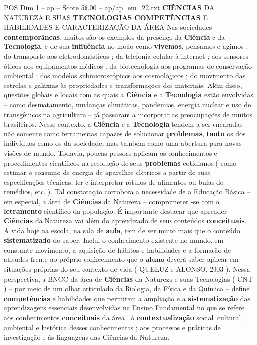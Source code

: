 \begin{textsample}{POS Dim 1 – ap – Score 56.00 – ap/ap\_em\_22.txt}  \label{ex:f1_pos_163}
\textbf{CIÊNCIAS} DA NATUREZA E SUAS \textbf{TECNOLOGIAS} \textbf{COMPETÊNCIAS} E HABILIDADES E CARACTERIZAÇÃO DA ÁREA Nas sociedades \textbf{contemporâneas}, muitos são os exemplos da presença da \textbf{Ciência} e da \textbf{Tecnologia}, e de sua \textbf{influência} no modo como \textbf{vivemos}, pensamos e agimos : do transporte aos eletrodomésticos ; da telefonia celular à internet ; dos sensores óticos aos equipamentos médicos ; da biotecnologia aos programas de conservação ambiental ; dos modelos submicroscópicos aos cosmológicos ; do movimento das estrelas e galáxias às propriedades e transformações dos materiais.
Além disso, questões globais e locais com as quais a \textbf{Ciência} e a \textbf{Tecnologia} estão envolvidas – como desmatamento, mudanças climáticas, pandemias, energia nuclear e uso de transgênicos na agricultura – já passaram a incorporar as preocupações de muitos brasileiros.
Nesse contexto, a \textbf{Ciência} e a \textbf{Tecnologia} tendem a ser encaradas não somente como ferramentas capazes de solucionar \textbf{problemas}, \textbf{tanto} os dos indivíduos como os da sociedade, mas também como uma abertura para novas visões de mundo.
Todavia, poucas pessoas aplicam os conhecimentos e procedimentos científicos na resolução de seus \textbf{problemas} cotidianos ( como estimar o consumo de energia de aparelhos elétricos a partir de suas especificações técnicas, ler e interpretar rótulos de alimentos ou bulas de remédios, etc. ).
Tal constatação corrobora a necessidade de a Educação Básica – em especial, a área de \textbf{Ciências} da Natureza – comprometer -se com o \textbf{letramento} científico da população.
É importante destacar que aprender \textbf{Ciências} da Natureza vai além do aprendizado de seus conteúdos \textbf{conceituais}.
A vida hoje na escola, na sala de \textbf{aula}, tem de ser muito mais que o conteúdo \textbf{sistematizado} do saber.
Inclui o conhecimento existente no mundo, em constante movimento, a aquisição de hábitos e habilidades e a formação de atitudes frente ao próprio conhecimento que o \textbf{aluno} deverá saber aplicar em situações próprias do seu contexto de vida ( QUELUZ e ALONSO, 2003 ).
Nessa perspectiva, a BNCC da área de \textbf{Ciências} da Natureza e suas Tecnologias ( CNT ) – por meio de um olhar articulado da Biologia, da Física e da Química – define \textbf{competências} e habilidades que permitem a ampliação e a \textbf{sistematização} das aprendizagens essenciais desenvolvidas no Ensino Fundamental no que se refere aos conhecimentos \textbf{conceituais} da área ; à \textbf{contextualização} social, cultural, ambiental e histórica desses conhecimentos ; aos processos e práticas de investigação e às linguagens das Ciências da Natureza.

\end{textsample}
